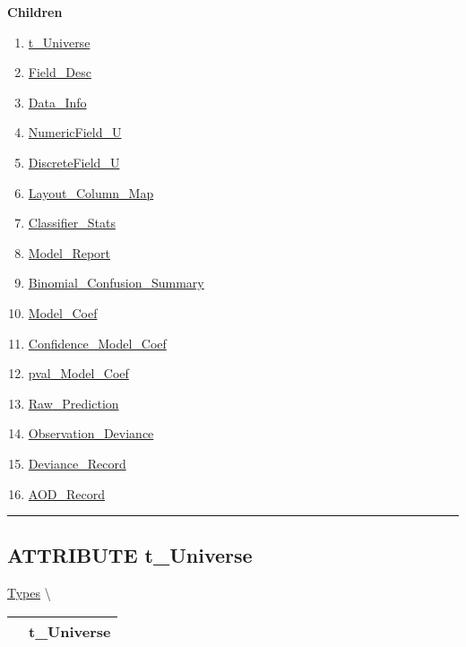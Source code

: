 \textbf{Children}
\begin{enumerate}
\item \hyperlink{ecldoc:types.t_universe}{t\_Universe}
\item \hyperlink{ecldoc:types.field_desc}{Field\_Desc}
\item \hyperlink{ecldoc:types.data_info}{Data\_Info}
\item \hyperlink{ecldoc:types.numericfield_u}{NumericField\_U}
\item \hyperlink{ecldoc:types.discretefield_u}{DiscreteField\_U}
\item \hyperlink{ecldoc:types.layout_column_map}{Layout\_Column\_Map}
\item \hyperlink{ecldoc:types.classifier_stats}{Classifier\_Stats}
\item \hyperlink{ecldoc:types.model_report}{Model\_Report}
\item \hyperlink{ecldoc:types.binomial_confusion_summary}{Binomial\_Confusion\_Summary}
\item \hyperlink{ecldoc:types.model_coef}{Model\_Coef}
\item \hyperlink{ecldoc:types.confidence_model_coef}{Confidence\_Model\_Coef}
\item \hyperlink{ecldoc:types.pval_model_coef}{pval\_Model\_Coef}
\item \hyperlink{ecldoc:types.raw_prediction}{Raw\_Prediction}
\item \hyperlink{ecldoc:types.observation_deviance}{Observation\_Deviance}
\item \hyperlink{ecldoc:types.deviance_record}{Deviance\_Record}
\item \hyperlink{ecldoc:types.aod_record}{AOD\_Record}
\end{enumerate}

\rule{\linewidth}{0.5pt}

\subsection*{\textsf{\colorbox{headtoc}{\color{white} ATTRIBUTE}
t\_Universe}}

\hypertarget{ecldoc:types.t_universe}{}
\hspace{0pt} \hyperlink{ecldoc:Types}{Types} \textbackslash 

{\renewcommand{\arraystretch}{1.5}
\begin{tabularx}{\textwidth}{|>{\raggedright\arraybackslash}l|X|}
\hline
\hspace{0pt}\mytexttt{\color{red} } & \textbf{t\_Universe} \\
\hline
\end{tabularx}
}

